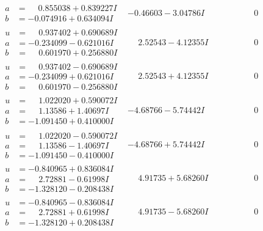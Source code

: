 \documentclass[1p]{elsarticle_modified}
\theoremstyle{definition}
\begin{document}
$$\begin{array}{c|c|c}
\begin{aligned}
a &= \phantom{-}0.855038 + 0.839227 I \\
b &= -0.074916 + 0.634094 I\end{aligned}
 & -0.46603 - 3.04786 I & \phantom{-0.000000 } 0 \\ \hline\begin{aligned}
u &= \phantom{-}0.937402 + 0.690689 I \\
a &= -0.234099 - 0.621016 I \\
b &= \phantom{-}0.601970 + 0.256880 I\end{aligned}
 & \phantom{-}2.52543 - 4.12355 I & \phantom{-0.000000 } 0 \\ \hline\begin{aligned}
u &= \phantom{-}0.937402 - 0.690689 I \\
a &= -0.234099 + 0.621016 I \\
b &= \phantom{-}0.601970 - 0.256880 I\end{aligned}
 & \phantom{-}2.52543 + 4.12355 I & \phantom{-0.000000 } 0 \\ \hline\begin{aligned}
u &= \phantom{-}1.022020 + 0.590072 I \\
a &= \phantom{-}1.13586 + 1.40697 I \\
b &= -1.091450 + 0.410000 I\end{aligned}
 & -4.68766 - 5.74442 I & \phantom{-0.000000 } 0 \\ \hline\begin{aligned}
u &= \phantom{-}1.022020 - 0.590072 I \\
a &= \phantom{-}1.13586 - 1.40697 I \\
b &= -1.091450 - 0.410000 I\end{aligned}
 & -4.68766 + 5.74442 I & \phantom{-0.000000 } 0 \\ \hline\begin{aligned}
u &= -0.840965 + 0.836084 I \\
a &= \phantom{-}2.72881 - 0.61998 I \\
b &= -1.328120 - 0.208438 I\end{aligned}
 & \phantom{-}4.91735 + 5.68260 I & \phantom{-0.000000 } 0 \\ \hline\begin{aligned}
u &= -0.840965 - 0.836084 I \\
a &= \phantom{-}2.72881 + 0.61998 I \\
b &= -1.328120 + 0.208438 I\end{aligned}
 & \phantom{-}4.91735 - 5.68260 I & \phantom{-0.000000 } 0\\

\end{array}$$
\end{document}
